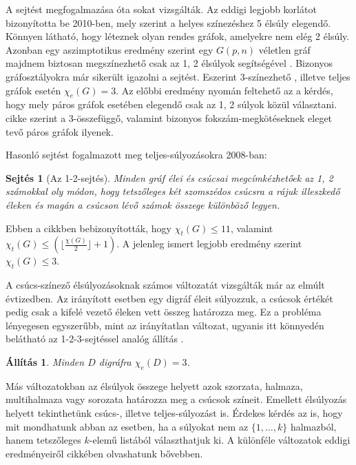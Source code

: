 \documentclass[12pt, a4paper]{report}
\newtheorem{áll}[tét]{Állítás}
\newtheorem{sej}[tét]{Sejtés}
\theoremstyle{remark}
\theoremstyle{definition}
\begin{document}
A sejtést megfogalmazása óta sokat vizsgálták. Az eddigi legjobb korlátot \citeauthor{Kalkowski2010} \cite{Kalkowski2010} bizonyította be 2010-ben, mely szerint a helyes színezéshez 5 élsúly elegendő. Könnyen látható, hogy léteznek olyan rendes gráfok, amelyekre nem elég 2 élsúly. Azonban egy aszimptotikus eredmény szerint egy $G(p, n)$ véletlen gráf majdnem biztosan megszínezhető csak az 1, 2 élsúlyok segítségével \cite{AddarioBerry2008}. Bizonyos gráfosztályokra már sikerült igazolni a sejtést. Eszerint 3-színezhető \cite{Karonski2004}, illetve teljes gráfok \cite{Alaeiyan2012} esetén $\chi_e(G) = 3$. Az előbbi eredmény nyomán feltehető az a kérdés, hogy mely páros gráfok esetében elegendő csak az 1, 2 súlyok közül választani. \citeauthor{Lu2011} \cite{Lu2011} cikke szerint a 3-összefüggő, valamint bizonyos fokszám-megkötéseknek eleget tevő páros gráfok ilyenek.

Hasonló sejtést fogalmazott meg teljes-súlyozásokra \citeauthor{Przybylo2010} 2008-ban:

\begin{sej}[Az 1-2-sejtés]
Minden gráf élei és csúcsai megcímkézhetőek az 1, 2 számokkal oly módon, hogy tetszőleges két szomszédos csúcsra a rájuk illeszkedő éleken és magán a csúcson lévő számok összege különböző legyen.
\end{sej}

Ebben a cikkben bebizonyították, hogy $\chi_t(G) \leq 11$, valamint $\chi_t(G) \leq (\lfloor \frac{χ(G)}{2} \rfloor + 1)$. A jelenleg ismert legjobb eredmény szerint $\chi_t(G) \leq 3$.

A csúcs-színező élsúlyozásoknak számos változatát vizsgálták már az elmúlt évtizedben. Az irányított esetben egy digráf éleit súlyozzuk, a csúcsok értékét pedig csak a kifelé vezető éleken vett összeg határozza meg. Ez a probléma lényegesen egyszerűbb, mint az irányítatlan változat, ugyanis itt könnyedén belátható az 1-2-3-sejtéssel analóg állítás \cite{Baudon2014}.

\begin{áll}
Minden $D$ digráfra $\chi_e(D) = 3$.
\end{áll}

Más változatokban az élsúlyok összege helyett azok szorzata, halmaza, multihalmaza vagy sorozata határozza meg a csúcsok színeit. Emellett élsúlyozás helyett tekinthetünk csúcs-, illetve teljes-súlyozást is. Érdekes kérdés az is, hogy mit mondhatunk abban az esetben, ha a súlyokat nem az $\lbrace 1, \ldots, k \rbrace$ halmazból, hanem tetszőleges $k$-elemű listából választhatjuk ki. A különféle változatok eddigi eredményeiről \citeauthor{Seamone2012} \cite{Seamone2012} cikkében olvashatunk bővebben.
\end{document}
